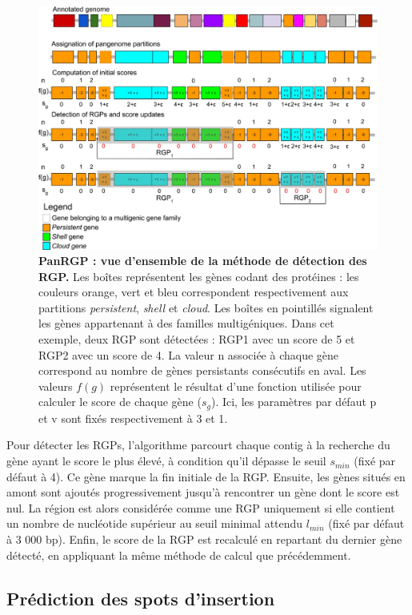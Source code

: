 \begin{figure}[htbp]
    \centering
    \includegraphics[width=0.8\linewidth]{images/panRGP.jpeg}
    \caption[PanRGP : vue d’ensemble de la méthode de détection des RGP]{\textbf{PanRGP : vue d’ensemble de la méthode de détection des RGP.} Les boîtes représentent les gènes codant des protéines : les couleurs orange, vert et bleu correspondent respectivement aux partitions \textit{persistent}, \textit{shell} et \textit{cloud}. Les boîtes en pointillés signalent les gènes appartenant à des familles multigéniques. Dans cet exemple, deux RGP sont détectées : RGP1 avec un score de 5 et RGP2 avec un score de 4. La valeur n associée à chaque gène correspond au nombre de gènes persistants consécutifs en aval. Les valeurs $f(g)$ représentent le résultat d'une fonction utilisée pour calculer le score de chaque gène ($s_g$). Ici, les paramètres par défaut p et v sont fixés respectivement à 3 et 1.}
    \label{fig:panRGP}
\end{figure}

Pour détecter les RGPs, l’algorithme parcourt chaque contig à la recherche du gène ayant le score le plus élevé, à condition qu’il dépasse le seuil $s_{min}$ (fixé par défaut à 4). Ce gène marque la fin initiale de la RGP. Ensuite, les gènes situés en amont sont ajoutés progressivement jusqu’à rencontrer un gène dont le score est nul. La région est alors considérée comme une RGP uniquement si elle contient un nombre de nucléotide supérieur au seuil minimal attendu $l_{min}$ (fixé par défaut à 3 000 bp). Enfin, le score de la RGP est recalculé en repartant du dernier gène détecté, en appliquant la même méthode de calcul que précédemment.

\subsection{Prédiction des spots d'insertion}

